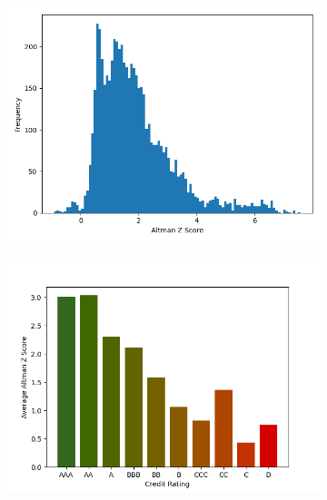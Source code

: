 \documentclass{article}[11pt]
\begin{document}
    \begin{figure}
        \caption{Altman Z-Score}
        \begin{subfigure}[h]{0.4925\textwidth}
            \centering
            \includegraphics[width=0.95\hsize]{../Output/All Data EDA/Tabular EDA/altman_z_score_all_data_no_title.png}
        \end{subfigure}
        \begin{subfigure}[h]{0.4925\textwidth}
            \centering
            \includegraphics[width=0.95\hsize]{../Output/All Data EDA/Tabular EDA/mean_altman_Z_by_credit_rating_no_title.png}
        \end{subfigure}
        \hfill
        \label{fig:altman-z-score}
    \end{figure}
\end{document}
